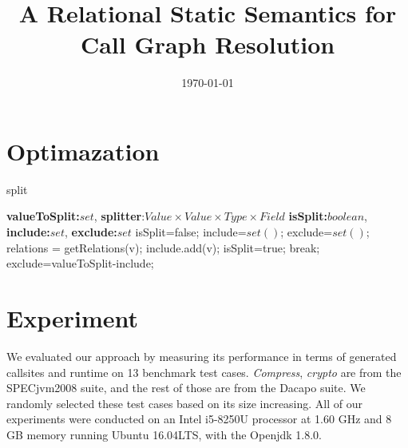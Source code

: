 \documentclass{llncs}
\title{A Relational Static Semantics for Call Graph Resolution}
\author{\today}
\institute{Jinan University}
\begin{document}
\maketitle


\section{Optimazation}\label{sec:optimazation}
\begin{algorithm}
\caption{split}
\label{alg:split}
\begin{algorithmic}
\REQUIRE \textbf{valueToSplit:}$set$, \textbf{splitter}:$Value \times Value \times Type \times Field$
\ENSURE \textbf{isSplit:}$boolean$, \textbf{include:}$set$, \textbf{exclude:}$set$
\STATE isSplit=false;
\STATE include=$set()$;
\STATE exclude=$set()$;
\STATE relations = getRelations(v);		
\STATE include.add(v);
\STATE isSplit=true;
\STATE break;
\ENDIF
\ENDFOR
\ENDFOR
{}
	\STATE exclude=valueToSplit-include;
\ENDIF

\end{algorithmic}
\end{algorithm}

\section{Experiment}\label{sec:experiment}
We evaluated our approach by measuring its performance in terms of generated callsites and runtime on 13 benchmark test cases. \textit{Compress}, \textit{crypto} are from the SPECjvm2008 suite, and the rest of those are from the Dacapo suite. We randomly selected these test cases based on its size increasing.
All of our experiments were conducted on an Intel i5-8250U processor at 1.60 GHz and 8 GB memory running Ubuntu 16.04LTS, with the Openjdk 1.8.0.
\end{document}
